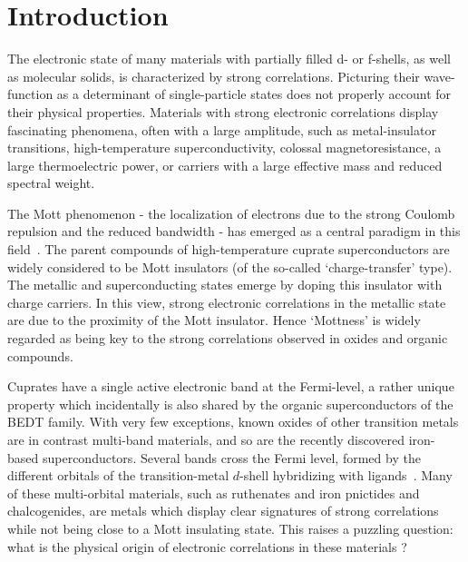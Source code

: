 \documentclass[]{ar2e-changed}%
\begin{document}
\section{Introduction}
\label{sec:intro}

The electronic state of many materials with partially filled d- or f-shells, as well as molecular solids, 
is characterized by strong correlations. Picturing their wave-function as a determinant of 
single-particle states does not properly account for their physical properties.  
%
Materials with strong electronic correlations display fascinating phenomena, often with a large amplitude, such as metal-insulator 
transitions, high-temperature superconductivity, colossal magnetoresistance, a large thermoelectric power, or 
carriers with a large effective mass and reduced spectral weight.  
%

The Mott phenomenon - the localization of electrons due to the strong Coulomb repulsion and the 
reduced bandwidth - has emerged as a central paradigm in this field~\cite{imada_mit_review}. 
%
The parent compounds of high-temperature cuprate superconductors are widely considered to be 
Mott insulators (of the so-called `charge-transfer' type). The metallic and superconducting states 
emerge by doping this insulator with charge carriers. 
%
In this view, strong electronic correlations in the metallic state are due to the proximity of the Mott 
insulator. Hence `Mottness' is widely regarded as being key to the strong correlations observed in 
oxides and organic compounds. 
%

Cuprates have a single active electronic band at the Fermi-level, a rather unique property which incidentally 
is also shared by the organic superconductors of the BEDT family.  
%
With very few exceptions, known oxides of other transition metals are in contrast multi-band materials, and so 
are the recently discovered iron-based superconductors. Several bands cross the Fermi level, formed by the 
different orbitals of the transition-metal $d$-shell hybridizing with ligands~\cite{TokuraNagaosa_OrbitalPhysics}.  
%
Many of these multi-orbital materials, such as ruthenates and iron pnictides and chalcogenides, 
are metals which display clear signatures of strong correlations while not being close to a Mott insulating 
state.
%
This raises a puzzling question: what is the physical origin of electronic correlations in these 
materials ?
\end{document}
